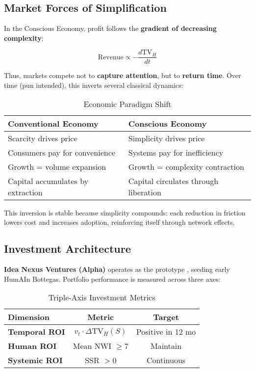 \subsection{Market Forces of Simplification}
\label{sec:market-forces}

In the Conscious Economy, profit follows the \textbf{gradient of decreasing complexity}:

\begin{equation}
\label{eq:revenue-gradient}
\text{Revenue} \propto -\frac{d\text{TV}_H}{dt}
\end{equation}

Thus, markets compete not to \textbf{capture attention}, but to \textbf{return time}. Over time (pun intended), this inverts several classical dynamics:

\begin{table}[h]
\centering
\caption{Economic Paradigm Shift}
\label{tab:paradigm-shift}
\begin{tabular}{p{5.5cm}p{5.5cm}}
\toprule
\textbf{Conventional Economy} & \textbf{Conscious Economy} \\
\midrule
Scarcity drives price & Simplicity drives price \\
Consumers pay for convenience & Systems pay for inefficiency \\
Growth = volume expansion & Growth = complexity contraction \\
Capital accumulates by extraction & Capital circulates through liberation \\
\bottomrule
\end{tabular}
\end{table}

This inversion is stable because simplicity compounds: each reduction in friction lowers cost and increases adoption, reinforcing itself through network effects.

\subsection{Investment Architecture}
\label{sec:investment-architecture}

\textbf{Idea Nexus Ventures (Alpha)} operates as the prototype , seeding early HumAIn Bottegas. Portfolio performance is measured across three axes:

\begin{table}[h]
\centering
\caption{Triple-Axis Investment Metrics}
\label{tab:investment-metrics}
\begin{tabular}{lcc}
\toprule
\textbf{Dimension} & \textbf{Metric} & \textbf{Target} \\
\midrule
\textbf{Temporal ROI} & $v_t \cdot \Delta \text{TV}_H(S)$ & Positive in 12 mo \\
\textbf{Human ROI} & Mean NWI $\geq 7$ & Maintain \\
\textbf{Systemic ROI} & SSR $> 0$ & Continuous \\
\bottomrule
\end{tabular}
\end{table}

